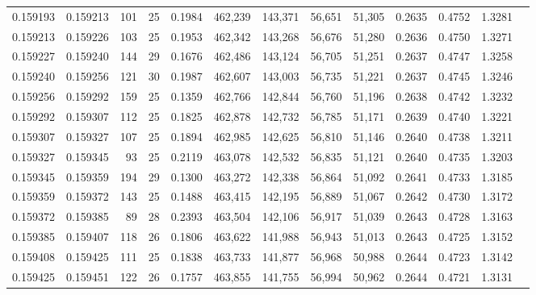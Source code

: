 \begin{tabular}{rrrrrrrrrrrrr}
0.159193 & 0.159213 & 101 &  25 &                                     0.1984 & 462,239 & 143,371 &  56,651 &  51,305 & 0.2635 & 0.4752 & 1.3281 \\
0.159213 & 0.159226 & 103 &  25 &                                     0.1953 & 462,342 & 143,268 &  56,676 &  51,280 & 0.2636 & 0.4750 & 1.3271 \\
0.159227 & 0.159240 & 144 &  29 &                                     0.1676 & 462,486 & 143,124 &  56,705 &  51,251 & 0.2637 & 0.4747 & 1.3258 \\
0.159240 & 0.159256 & 121 &  30 &                                     0.1987 & 462,607 & 143,003 &  56,735 &  51,221 & 0.2637 & 0.4745 & 1.3246 \\
0.159256 & 0.159292 & 159 &  25 &                                     0.1359 & 462,766 & 142,844 &  56,760 &  51,196 & 0.2638 & 0.4742 & 1.3232 \\
0.159292 & 0.159307 & 112 &  25 &                                     0.1825 & 462,878 & 142,732 &  56,785 &  51,171 & 0.2639 & 0.4740 & 1.3221 \\
0.159307 & 0.159327 & 107 &  25 &                                     0.1894 & 462,985 & 142,625 &  56,810 &  51,146 & 0.2640 & 0.4738 & 1.3211 \\
0.159327 & 0.159345 &  93 &  25 &                                     0.2119 & 463,078 & 142,532 &  56,835 &  51,121 & 0.2640 & 0.4735 & 1.3203 \\
0.159345 & 0.159359 & 194 &  29 &                                     0.1300 & 463,272 & 142,338 &  56,864 &  51,092 & 0.2641 & 0.4733 & 1.3185 \\
0.159359 & 0.159372 & 143 &  25 &                                     0.1488 & 463,415 & 142,195 &  56,889 &  51,067 & 0.2642 & 0.4730 & 1.3172 \\
0.159372 & 0.159385 &  89 &  28 &                                     0.2393 & 463,504 & 142,106 &  56,917 &  51,039 & 0.2643 & 0.4728 & 1.3163 \\
0.159385 & 0.159407 & 118 &  26 &                                     0.1806 & 463,622 & 141,988 &  56,943 &  51,013 & 0.2643 & 0.4725 & 1.3152 \\
0.159408 & 0.159425 & 111 &  25 &                                     0.1838 & 463,733 & 141,877 &  56,968 &  50,988 & 0.2644 & 0.4723 & 1.3142 \\
0.159425 & 0.159451 & 122 &  26 &                                     0.1757 & 463,855 & 141,755 &  56,994 &  50,962 & 0.2644 & 0.4721 & 1.3131 \\

\end{tabular}
